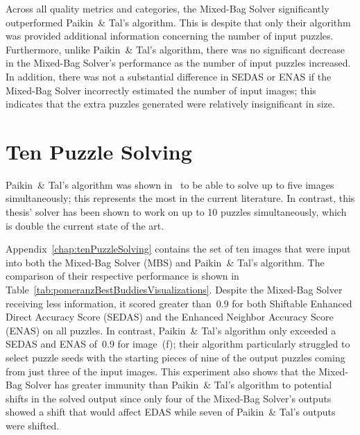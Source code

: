 Across all quality metrics and categories, the Mixed-Bag Solver significantly outperformed Paikin~\& Tal's algorithm.  This is despite that only their algorithm was provided additional information concerning the number of input puzzles.  Furthermore, unlike Paikin~\& Tal's algorithm, there was no significant decrease in the Mixed-Bag Solver's performance as the number of input puzzles increased.  In addition, there was not a substantial difference in SEDAS or ENAS if the Mixed-Bag Solver incorrectly estimated the number of input images; this indicates that the extra puzzles generated were relatively insignificant in size.  

\section{Ten Puzzle Solving}

Paikin~\& Tal's algorithm was shown in~\cite{paikin2015} to be able to solve up to five images simultaneously; this represents the most in the current literature.  In contrast, this thesis' solver has been shown to work on up to 10 puzzles simultaneously, which is double the current state of the art.

Appendix~\ref{chap:tenPuzzleSolving} contains the set of ten images that were input into both the Mixed-Bag Solver (MBS) and Paikin~\& Tal's algorithm.  The comparison of their respective performance is shown in Table~\ref{tab:pomeranzBestBuddiesVisualizations}.  Despite the Mixed-Bag Solver receiving less information, it scored greater than~0.9 for both Shiftable Enhanced Direct Accuracy Score (SEDAS) and the Enhanced Neighbor Accuracy Score (ENAS) on all puzzles.  In contrast, Paikin~\& Tal's algorithm only exceeded a SEDAS and ENAS of~0.9 for image~(f); their algorithm particularly struggled to select puzzle seeds with the starting pieces of nine of the output puzzles coming from just three of the input images.  This experiment also shows that the Mixed-Bag Solver has greater immunity than Paikin~\& Tal's algorithm to potential shifts in the solved output since only four of the Mixed-Bag Solver's outputs showed a shift that would affect EDAS while seven of Paikin~\& Tal's outputs were shifted.

